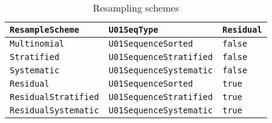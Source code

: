 \begin{table}
  \begin{tabularx}{\textwidth}{lLl}
    \toprule
    \verb|ResampleScheme| & \verb|U01SeqType| & \verb|Residual| \\
    \midrule
    \verb|Multinomial|        & \verb|U01SequenceSorted|     & \verb|false| \\
    \verb|Stratified|         & \verb|U01SequenceStratified| & \verb|false| \\
    \verb|Systematic|         & \verb|U01SequenceSystematic| & \verb|false| \\
    \verb|Residual|           & \verb|U01SequenceSorted|     & \verb|true|  \\
    \verb|ResidualStratified| & \verb|U01SequenceStratified| & \verb|true|  \\
    \verb|ResidualSystematic| & \verb|U01SequenceSystematic| & \verb|true|  \\
    \bottomrule
  \end{tabularx}
  \caption{Resampling schemes}
  \label{tab:Resampling schemes}
\end{table}
